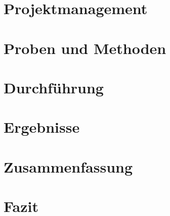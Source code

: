 \documentclass[12pt,a4paper,ngerman,captions=tableheading]{scrartcl}
\begin{document}
\section{Projektmanagement}



\section{Proben und Methoden}



\section{Durchführung}




\section{Ergebnisse}




\section{Zusammenfassung}



\section{Fazit}

\newpage
\end{document}
